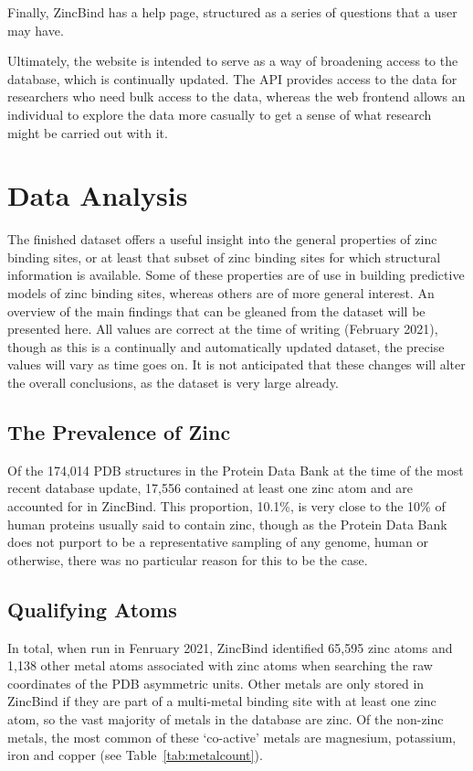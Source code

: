 Finally, ZincBind has a help page, structured as a series of questions that a user may have.

Ultimately, the website is intended to serve as a way of broadening access to the database, which is continually updated. The API provides access to the data for researchers who need bulk access to the data, whereas the web frontend allows an individual to explore the data more casually to get a sense of what research might be carried out with it.

\section{Data Analysis}

The finished dataset offers a useful insight into the general properties of zinc binding sites, or at least that subset of zinc binding sites for which structural information is available. Some of these properties are of use in building predictive models of zinc binding sites, whereas others are of more general interest. An overview of the main findings that can be gleaned from the dataset will be presented here. All values are correct at the time of writing (February 2021), though as this is a continually and automatically updated dataset, the precise values will vary as time goes on. It is not anticipated that these changes will alter the overall conclusions, as the dataset is very large already.

\subsection{The Prevalence of Zinc}

Of the 174,014 PDB structures in the Protein Data Bank at the time of the most recent database update, 17,556 contained at least one zinc atom and are accounted for in ZincBind. This proportion, 10.1\%, is very close to the 10\% of human proteins usually said to contain zinc, though as the Protein Data Bank does not purport to be a representative sampling of any genome, human or otherwise, there was no particular reason for this to be the case.

\subsection{Qualifying Atoms}

In total, when run in Fenruary 2021, ZincBind identified 65,595 zinc atoms and 1,138 other metal atoms associated with zinc atoms when searching the raw coordinates of the PDB asymmetric units. Other metals are only stored in ZincBind if they are part of a multi-metal binding site with at least one zinc atom, so the vast majority of metals in the database are zinc. Of the non-zinc metals, the most common of these `co-active' metals are magnesium, potassium, iron and copper (see Table~\ref{tab:metalcount}).

